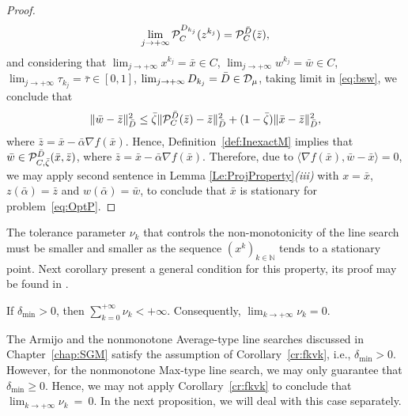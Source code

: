 \begin{proof}
	$$
		\lim_{j \to +\infty}{\cal P}_{C}^{D_{k_j}}(z^{k_j})= {\cal P}_{C}^{\bar D}(\bar{z}),
	$$
	and considering that $\lim_{j\to +\infty} x^{k_j} = \bar{x}\in C$, $\lim_{j\to +\infty} w^{k_j} = \bar{w}\in C$, $\lim_{j \to +\infty} \tau_{k_j} = \bar{\tau} \in [0,1]$,   $\lim_{j \to +\infty} D_{k_j} = \bar{D}\in {\cal D}_{\mu}$, taking limit in \eqref{eq:bsw},  we conclude that
	$$
		\|\bar{w} -\bar{z}\|_{\bar D}^2\leq  {\bar \zeta}  \| {\cal P}_{C}^{\bar D}(\bar{z})-\bar{z}\|_{\bar D}^2+(1- {\bar \zeta} )\| \bar{x}-\bar{z}\|_{\bar D}^2 ,
	$$
	where $\bar{z} = \bar{x}-{\bar \alpha} \nabla f(\bar{x})$. Hence, Definition~\ref{def:InexactM} implies  that ${\bar w}\in  {\cal P}_{C,{\bar \zeta}}^{\bar D}( {\bar x}, {\bar z})$, where $\bar{z} = \bar{x}-{\bar \alpha} \nabla f(\bar{x})$. Therefore, due to $\langle \nabla f(\bar{x}), \bar{w}-\bar{x} \rangle = 0$, we may apply second sentence in Lemma \ref{Le:ProjProperty}{\it (iii)} with $x = \bar{x}$, $z({\bar \alpha}) = \bar{z}$ and $w({\bar \alpha}) = \bar{w}$, to conclude that $\bar{x}$ is stationary for problem~\eqref{eq:OptP}.
\end{proof}



The tolerance parameter $\nu_{k}$ that controls the non-monotonicity of the line search must be smaller and smaller as the sequence $(x^k)_{k\in\mathbb{N}}$  tends to  a stationary point. Next corollary present a general condition for this property, its proof may be found in \cite[Theorem 4]{GrapigliaSachs2017}.
\begin{corollary} \label{cr:fkvk}
	If $\delta_{\min}>0$,  then  $\sum_{k=0}^{+\infty} \nu_k<+\infty$. Consequently, $\lim_{k\to +\infty} \nu_{k} = 0$.
\end{corollary}

The Armijo and the nonmonotone Average-type line searches discussed in Chapter~\ref{chap:SGM} satisfy  the assumption of Corollary~\ref{cr:fkvk}, i.e., $\delta_{\min}>0$.  However,    for  the  nonmonotone Max-type line search,  we   may only guarantee that $\delta_{\min}\geq 0$. Hence,  we may not apply  Corollary~\ref{cr:fkvk}  to conclude that $\lim_{k\to +\infty} \nu_{k}~=~0$.  In the next proposition, we will deal with this case separately.

